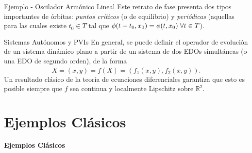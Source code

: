 \documentclass{beamer}
\newcommand{\R}{{\ensuremath{\mathbb{R}}}}
\newcommand{\stframe}[1]{\begin{frame} \begin{center}\Large{\textbf{{#1}}}\end{center}\end{frame}}
\begin{document}
\begin{frame}{Ejemplo - Oscilador Armónico Lineal}
Este retrato de fase presenta dos tipos importantes de órbitas: \emph{puntos críticos} (o de equilibrio) y \emph{periódicas} (aquellas para las cuales existe $t_0 \in T$ tal que $\phi(t+t_0, x_0) = \phi(t,x_0) \hspace{0.1cm} \forall t \in T$).
\end{frame}

\begin{frame}{Sistemas Autónomos y PVIs}
En general, se puede definir el operador de evolución de un sistema dinámico plano a partir de un sistema de dos EDOs simultáneas (o una EDO de segundo orden), de la forma
$$\dot{X} = (\dot{x}, \dot{y}) = f(X) = (f_1(x,y), f_2(x,y)). $$
Un resultado clásico de la teoría de ecuaciones diferenciales garantiza que esto es posible siempre que $f$ sea continua y localmente Lipschitz sobre $\R^2$.
\end{frame}

%
%
%
%
%
%
%


\section{Ejemplos Clásicos}
\stframe{Ejemplos Clásicos}
\end{document}

